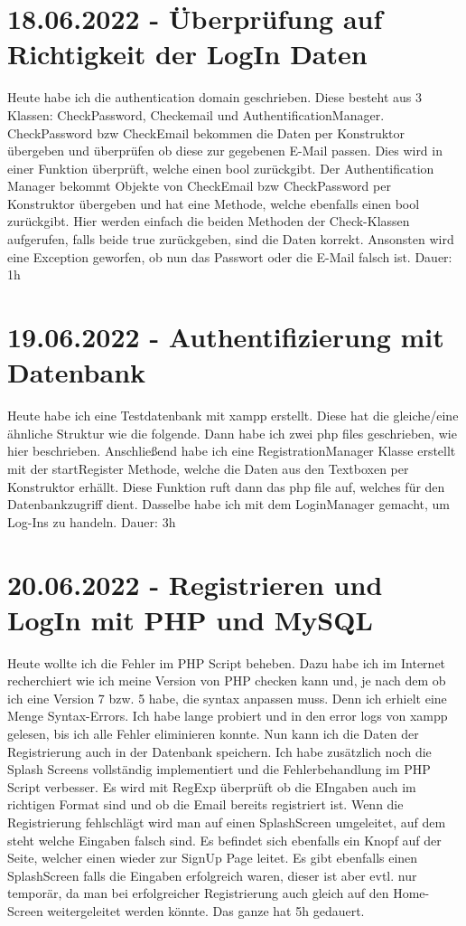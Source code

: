 \documentclass[letterpaper,10pt]{article}
\begin{document}
\section{18.06.2022 - Überprüfung auf Richtigkeit der LogIn Daten}
Heute habe ich die authentication domain geschrieben. Diese besteht aus 3 Klassen: CheckPassword, Checkemail und AuthentificationManager. CheckPassword bzw CheckEmail bekommen die Daten per Konstruktor übergeben und überprüfen ob diese zur gegebenen E-Mail passen. Dies wird in einer Funktion überprüft, welche einen bool zurückgibt. Der Authentification Manager bekommt Objekte von CheckEmail bzw CheckPassword per Konstruktor übergeben und hat eine Methode, welche ebenfalls einen bool zurückgibt. Hier werden einfach die beiden Methoden der Check-Klassen aufgerufen, falls beide true zurückgeben, sind die Daten korrekt. Ansonsten wird eine Exception geworfen, ob nun das Passwort oder die E-Mail falsch ist. Dauer: 1h
\section{19.06.2022 - Authentifizierung mit Datenbank}
Heute habe ich eine Testdatenbank mit xampp erstellt. Diese hat die gleiche/eine ähnliche Struktur wie die folgende. Dann habe ich zwei php files geschrieben, wie hier beschrieben\cite{mysql-php}. Anschließend habe ich eine RegistrationManager Klasse erstellt mit der startRegister Methode, welche die Daten aus den Textboxen per Konstruktor erhällt. Diese Funktion ruft dann das php file auf, welches für den Datenbankzugriff dient. Dasselbe habe ich mit dem LoginManager gemacht, um Log-Ins zu handeln. Dauer: 3h 
\section{20.06.2022 - Registrieren und LogIn mit PHP und MySQL}
Heute wollte ich die Fehler im PHP Script beheben. Dazu habe ich im Internet recherchiert wie ich meine Version von PHP checken kann und, je nach dem ob ich eine Version 7 bzw. 5 habe, die syntax anpassen muss. Denn ich erhielt eine Menge Syntax-Errors. Ich habe lange probiert und in den error logs von xampp gelesen, bis ich alle Fehler eliminieren konnte. Nun kann ich die Daten der Registrierung auch in der Datenbank speichern. Ich habe zusätzlich noch die Splash Screens vollständig implementiert und die Fehlerbehandlung im PHP Script verbesser. Es wird mit RegExp überprüft ob die EIngaben auch im richtigen Format sind und ob die Email bereits registriert ist. Wenn die Registrierung fehlschlägt wird man auf einen SplashScreen umgeleitet, auf dem steht welche Eingaben falsch sind. Es befindet sich ebenfalls ein Knopf auf der Seite, welcher einen wieder zur SignUp Page leitet. Es gibt ebenfalls einen SplashScreen falls die Eingaben erfolgreich waren, dieser ist aber evtl. nur temporär, da man bei erfolgreicher Registrierung auch gleich auf den Home-Screen weitergeleitet werden könnte. Das ganze hat 5h gedauert.  
\printbibliography
\end{document}
